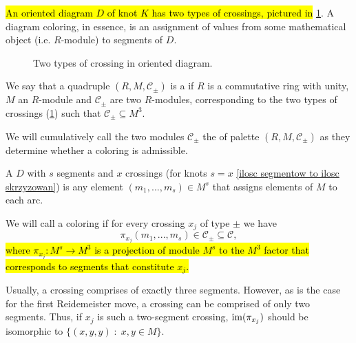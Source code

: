 \hl{An oriented diagram $D$ of knot $K$ has two types of crossings, pictured in} \cref{crossing_type}. A diagram coloring, in essence, is an assignment of values from some mathematical object (i.e. $R$-module) to segments of $D$.

\begin{figure}[h]\centering
  \caption{Two types of crossing in oriented diagram.\label{crossing_type}}
\end{figure}

\begin{definition}[palette]
  We say that a quadruple {\boldmath$(R, M, \mathcal{C}_\pm)$} is a  if $R$ is a commutative ring with unity, $M$ an $R$-module and $\mathcal{C}_\pm$ are two $R$-modules, corresponding to the two types of crossings (\cref{crossing_type}) such that $\mathcal{C}_\pm\subseteq M^3$.
\end{definition}

We will cumulatively call the two modules $\mathcal{C}_\pm$ the  of palette $(R, M, \mathcal{C}_\pm)$ as they determine whether a coloring is admissible.

\begin{definition}
  A  $D$ with $s$ segments and $x$ crossings (for knots $s=x$ \cref{ilosc segmentow to ilosc skrzyzowan}) is any element $(m_1,..., m_s)\in M^s$ that assigns elements of $M$ to each arc. 

  We will call a coloring  if for every crossing $x_j$ of type $\pm$ we have 
  $$\pi_{x_j}(m_1,..., m_s)\in \mathcal{C}_\pm\subseteq\mathcal{C},$$
\hl{where $\pi_{x_j}:M^s\to M^3$ is a projection of module $M^s$ to the $M^3$ factor that corresponds to segments that constitute $x_j$.} 
\end{definition}

Usually, a crossing comprises of exactly three segments. However, as is the case for the first Reidemeister move, a crossing can be comprised of only two segments. Thus, if $x_j$ is such a two-segment crossing, $\operatorname{im}(\pi_{x_j})$ should be isomorphic to $\{(x, y, y)\;:\;x,y\in M\}$.

